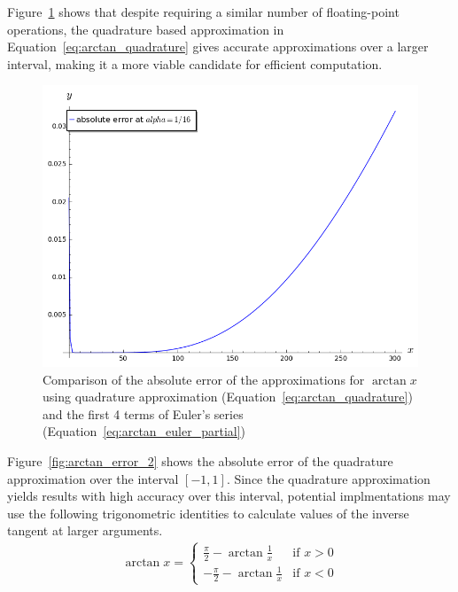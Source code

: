 Figure~\ref{fig:arctan_error} shows that despite requiring a similar number of floating-point operations, the quadrature based approximation in Equation~\ref{eq:arctan_quadrature} gives accurate approximations over a larger interval, making it a more viable candidate for efficient computation.
\begin{figure}[!ht]
		\centering
		\includegraphics[width=.9\linewidth]{figures/single_alpha_plot.png}
		\caption{Comparison of the absolute error of the approximations for $\arctan x$ using quadrature approximation (Equation~\ref{eq:arctan_quadrature}) and the first 4 terms of Euler's series (Equation~\ref{eq:arctan_euler_partial})}
		\label{fig:arctan_error}
\end{figure}

Figure~\ref{fig:arctan_error_2} shows the absolute error of the quadrature approximation over the interval $[-1,1]$. Since the quadrature approximation yields results with high accuracy over this interval, potential implmentations may use the following trigonometric identities to calculate values of the inverse tangent at larger arguments.
\begin{align*}
	\arctan x =
	\begin{cases}
		\frac{\pi}{2}-\arctan{\frac{1}{x}} & \text{if } x > 0 \\
		-\frac{\pi}{2}-\arctan{\frac{1}{x}} & \text{if } x < 0 
	\end{cases}
\end{align*}

